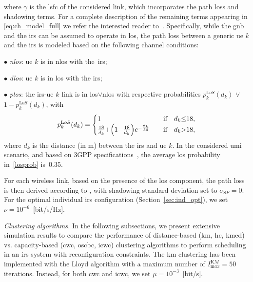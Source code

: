 where $\gamma$ is the \gls{lsfc} of the considered link, which incorporates the path loss and shadowing terms. For a complete description of the remaining terms appearing in \eqref{eq:ch_model_full} we refer the interested reader to~\cite{zugno20implementation}.
Specifically, while the \gls{gnb} and the \gls{irs} can be assumed to operate in \gls{los}, the path loss between a generic \gls{ue} $k$ and the \gls{irs} is modeled based on the following channel conditions:

\noindent $\bullet$ \emph{\gls{nlos}}: \gls{ue} $k$ is in \gls{nlos} with the~\gls{irs};

\noindent $\bullet$ \emph{\gls{dlos}}: \gls{ue} $k$ is in \gls{los} with the \gls{irs};

\noindent $\bullet$ \emph{\gls{plos}}: the \gls{irs}-\gls{ue} $k$ link is in \gls{los}$\vee$\gls{nlos} with respective probabilities $p_k^{\mathrm LoS}(d_k)$ $\vee$ $1{-}p_k^{\mathrm LoS}(d_k)$, with
\begin{equation}
\label{losprob}
p_k^{\mathrm LoS}(d_k) = 
\begin{cases}
1 \quad &\hbox{if} \quad d_k{\leq}18, \\
\frac{18}{d_k} {+} \left(1{-}\frac{18}{d_k}\right)e^{-\frac{d_k}{36}} \quad &\hbox{if} \quad d_k{>}18,
\end{cases}
\end{equation}
where $d_k$ is the distance (in m) between the \gls{irs} and \gls{ue} $k$. In the considered \gls{umi} scenario, and based on 3GPP specifications~\cite{3gpp.38.901}, the average \gls{los} probability in~\eqref{losprob} is~$0.35$.

For each wireless link, based on the presence of the \gls{los} component, the path loss is then derived according to \cite[Table 7.4.1-1]{3gpp.38.901}, with shadowing standard deviation set to $\sigma_{\mathrm SF}=0$.  
For the optimal individual \gls{irs} configuration (Section~\ref{sec:ind_opt}), we set $\nu = 10^{-6}$~[bit/s/Hz].

\emph{Clustering algorithms.}
In the following subsections, we present extensive simulation results to compare the performance of distance-based (\gls{km}, \gls{hc}, \gls{kmed}) vs. capacity-based (\gls{cwc}, \gls{oscbc}, \gls{icwc}) clustering algorithms to perform scheduling in an \gls{irs} system with reconfiguration constraints.
The \gls{km} clustering has been implemented with the Lloyd algorithm \cite{Kmeans} with a maximum number of $I_{\mathrm max}^{\mathrm KM}=50$ iterations. 
Instead, for both \gls{cwc} and \gls{icwc}, we set $\mu = 10^{-3}$~[bit/s].

